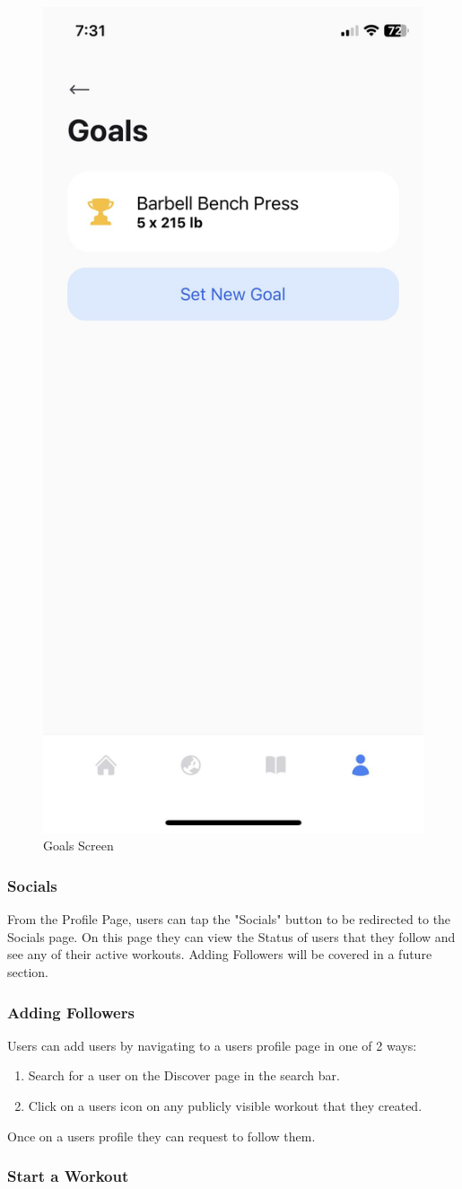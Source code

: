 \documentclass{article}
\begin{document}
\begin{figure}[H]
    \centering
    \includegraphics[height=0.6\textwidth]{imgs/Goals2.jpg}
    \caption{Goals Screen}
    \label{FigGoals}
    \end{figure}

\subsubsection{Socials}

From the Profile Page, users can tap the "Socials" button to be redirected to the Socials page. On this page they can view the Status of users that they follow and see any of their active workouts. Adding Followers will be covered in a future section.
    
\subsubsection{Adding Followers}

Users can add users by navigating to a users profile page in one of 2 ways:\\
\begin{enumerate}
    \item Search for a user on the Discover page in the search bar.
    \item Click on a users icon on any publicly visible workout that they created.
\end{enumerate}
Once on a users profile they can request to follow them.\\

\subsubsection{Start a Workout}
\end{document}
